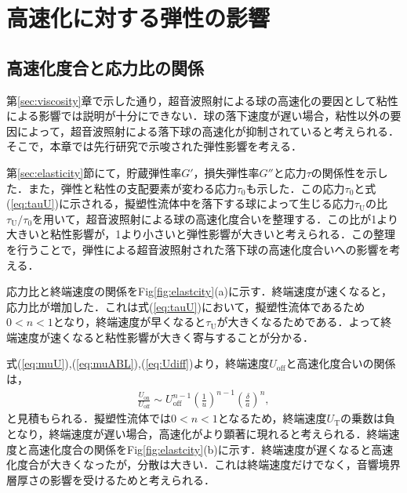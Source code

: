 \section{高速化に対する弾性の影響}
\label{sec:elasticity-discussion}

\subsection{高速化度合と応力比の関係}
第\ref{sec:viscosity}章で示した通り，超音波照射による球の高速化の要因として粘性による影響では説明が十分にできない．球の落下速度が遅い場合，粘性以外の要因によって，超音波照射による落下球の高速化が抑制されていると考えられる．そこで，本章では先行研究\cite{ref:8}で示唆された弾性影響を考える．

第\ref{sec:elasticity}節にて，貯蔵弾性率$G'$，損失弾性率$G''$と応力$\tau$の関係性を示した．また，弾性と粘性の支配要素が変わる応力$\tau_\text{0}$も示した．この応力$\tau_\text{0}$と式(\ref{eq:tauU})に示される，擬塑性流体中を落下する球によって生じる応力$\tau_\text{U}$の比$\tau_\text{U}/\tau_\text{0}$を用いて，超音波照射による球の高速化度合いを整理する．この比が1より大きいと粘性影響が，1より小さいと弾性影響が大きいと考えられる．この整理を行うことで，弾性による超音波照射された落下球の高速化度合いへの影響を考える．

応力比と終端速度の関係をFig\ref{fig:elastcity}(a)に示す．終端速度が速くなると，応力比が増加した．これは式(\ref{eq:tauU})において，擬塑性流体であるため$0<n<1$となり，終端速度が早くなると$\tau_\text{U}$が大きくなるためである．よって終端速度が速くなると粘性影響が大きく寄与することが分かる．

式(\ref{eq:muU}),(\ref{eq:muABL}),(\ref{eq:Udiff})より，終端速度$U_\text{off}$と高速化度合いの関係は，
\begin{eqnarray}
    \frac{U_\text{on}}{U_\text{off}} \sim U_\text{off}^{n-1} \left(\frac{1}{u}\right)^{n-1} \left(\frac{\delta}{a}\right)^n ,
    \label{eq:UTdiff_UT}
\end{eqnarray}
と見積もられる．擬塑性流体では$0<n<1$となるため，終端速度$U_\text{T}$の乗数は負となり，終端速度が遅い場合，高速化がより顕著に現れると考えられる．終端速度と高速化度合の関係をFig\ref{fig:elastcity}(b)に示す．終端速度が遅くなると高速化度合が大きくなったが，分散は大きい．これは終端速度だけでなく，音響境界層厚さの影響を受けるためと考えられる．

